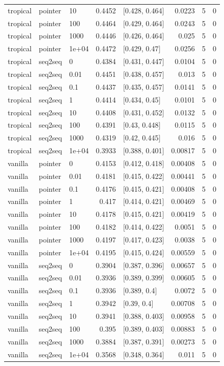 \documentclass[10pt]{article}
\begin{document}
{\begin{longtable}{lllrlrrr}
tropical & pointer & 10 & 0.4452 & [0.428, 0.464] & 0.0223 & 5 & 0\\
tropical & pointer & 100 & 0.4464 & [0.429, 0.464] & 0.0243 & 5 & 0\\
tropical & pointer & 1000 & 0.4446 & [0.426, 0.464] & 0.025 & 5 & 0\\
tropical & pointer & 1e+04 & 0.4472 & [0.429, 0.47] & 0.0256 & 5 & 0\\
tropical & seq2seq & 0 & 0.4384 & [0.431, 0.447] & 0.0104 & 5 & 0\\
tropical & seq2seq & 0.01 & 0.4451 & [0.438, 0.457] & 0.013 & 5 & 0\\
tropical & seq2seq & 0.1 & 0.4437 & [0.435, 0.457] & 0.0141 & 5 & 0\\
tropical & seq2seq & 1 & 0.4414 & [0.434, 0.45] & 0.0101 & 5 & 0\\
tropical & seq2seq & 10 & 0.4408 & [0.431, 0.452] & 0.0132 & 5 & 0\\
tropical & seq2seq & 100 & 0.4391 & [0.43, 0.448] & 0.0115 & 5 & 0\\
tropical & seq2seq & 1000 & 0.4319 & [0.42, 0.445] & 0.016 & 5 & 0\\
tropical & seq2seq & 1e+04 & 0.3933 & [0.388, 0.401] & 0.00817 & 5 & 0\\
vanilla & pointer & 0 & 0.4153 & [0.412, 0.418] & 0.00408 & 5 & 0\\
vanilla & pointer & 0.01 & 0.4181 & [0.415, 0.422] & 0.00441 & 5 & 0\\
vanilla & pointer & 0.1 & 0.4176 & [0.415, 0.421] & 0.00408 & 5 & 0\\
vanilla & pointer & 1 & 0.417 & [0.414, 0.421] & 0.00469 & 5 & 0\\
vanilla & pointer & 10 & 0.4178 & [0.415, 0.421] & 0.00419 & 5 & 0\\
vanilla & pointer & 100 & 0.4182 & [0.414, 0.422] & 0.0051 & 5 & 0\\
vanilla & pointer & 1000 & 0.4197 & [0.417, 0.423] & 0.0038 & 5 & 0\\
vanilla & pointer & 1e+04 & 0.4195 & [0.415, 0.424] & 0.00559 & 5 & 0\\
vanilla & seq2seq & 0 & 0.3904 & [0.387, 0.396] & 0.00657 & 5 & 0\\
vanilla & seq2seq & 0.01 & 0.3936 & [0.389, 0.399] & 0.00605 & 5 & 0\\
vanilla & seq2seq & 0.1 & 0.3936 & [0.389, 0.4] & 0.0072 & 5 & 0\\
vanilla & seq2seq & 1 & 0.3942 & [0.39, 0.4] & 0.00708 & 5 & 0\\
vanilla & seq2seq & 10 & 0.3941 & [0.388, 0.403] & 0.00958 & 5 & 0\\
vanilla & seq2seq & 100 & 0.395 & [0.389, 0.403] & 0.00883 & 5 & 0\\
vanilla & seq2seq & 1000 & 0.3884 & [0.387, 0.391] & 0.00273 & 5 & 0\\
vanilla & seq2seq & 1e+04 & 0.3568 & [0.348, 0.364] & 0.011 & 5 & 0\\
\bottomrule
\end{longtable}
}
\end{document}

